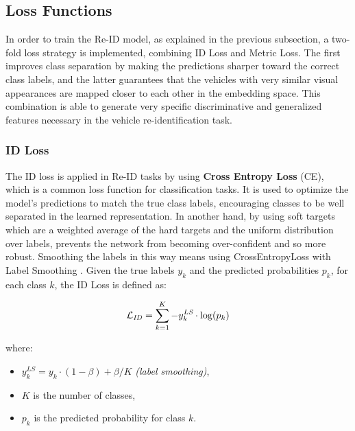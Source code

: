 
\subsection{Loss Functions}
\label{subsec:LossFunctions}
In order to train the Re-ID model, as explained in the previous subsection, a two-fold loss strategy is implemented, combining ID Loss and Metric Loss. The first improves class separation by making the predictions sharper toward the correct class labels, and the latter guarantees that the vehicles with very similar visual appearances are mapped closer to each other in the embedding space. This combination is able to generate very specific discriminative and generalized features necessary in the vehicle re-identification task.

\subsubsection{ID Loss}
The ID loss is applied in Re-ID tasks by using \textbf{Cross Entropy Loss} (CE), which is a common loss function for classification tasks. It is used to optimize the model's predictions to match the true class labels, encouraging classes to be well separated in the learned representation. In another hand, by using soft targets which are a weighted average of the hard targets and the uniform distribution over labels, prevents the network from becoming over-confident and so more robust. Smoothing the labels in this way means using CrossEntropyLoss with Label Smoothing \cite{LabelSmoothing, LabelSmoothing2}. Given the true labels $y_{k}$ and the predicted probabilities $p_{k}$, for each class $k$, the ID Loss is defined as:

\[
    \mathcal{L}_{\text{\textit{ID}}} = \sum_{k=1}^{K} - y_{k}^{\textit{LS}} \cdot \log (p_{k})
\]

where:
\begin{itemize}
    \item $y_{k}^{LS} = y_{k} \cdot (1-\beta) + \beta / K$ \textit{(label smoothing)},
    \item $K$ is the number of classes,
    \item $p_{k}$ is the predicted probability for class $k$.
\end{itemize}

